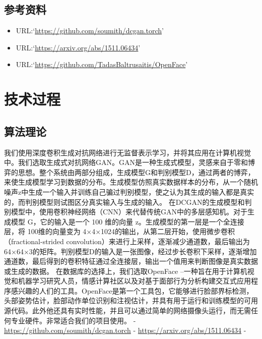 \documentclass[
  hyperref, a4paper]{ctexart}
\providecommand{\tightlist}{%
  \setlength{\itemsep}{0pt}\setlength{\parskip}{0pt}}
\begin{document}
\hypertarget{ux53c2ux8003ux8d44ux6599}{%
\subsection{参考资料}\label{ux53c2ux8003ux8d44ux6599}}

\begin{itemize}
\tightlist
\item
  URL:`\url{https://github.com/soumith/dcgan.torch}'
\item
  URL:`\url{https://arxiv.org/abs/1511.06434}'
\item
  URL:`\url{https://github.com/TadasBaltrusaitis/OpenFace}'
\end{itemize}

\hypertarget{ux6280ux672fux8fc7ux7a0b}{%
\section{技术过程}\label{ux6280ux672fux8fc7ux7a0b}}

\hypertarget{ux7b97ux6cd5ux7406ux8bba}{%
\subsection{算法理论}\label{ux7b97ux6cd5ux7406ux8bba}}

我们使用深度卷积生成对抗网络进行无监督表示学习，并将其应用在计算机视觉中。我们选取生成式对抗网络GAN。GAN是一种生成式模型，灵感来自于零和博弈的思想。整个系统由两部分组成，生成模型G和判别模型D，通过两者的博弈，来使生成模型学习到数据的分布。生成模型仿照真实数据样本的分布，从一个随机噪声z中生成一个输入并训练自己骗过判别模型，使之认为其生成的输入都是真实的，而判别模型则试图区分真实输入与生成的输入。
在DCGAN的生成模型和判别模型中，使用卷积神经网络（CNN）来代替传统GAN中的多层感知机。对于生成模型
G，它的输入是一个 100 维的向量 z。生成模型的第一层是一个全连接层，将
100维的向量变为
4×4×1024的输出，从第二层开始，使用微步卷积（fractional-strided
convolution）来进行上采样，逐渐减少通道数，最后输出为64×64×3的矩阵。判别模型D的输入是一张图像，经过步长卷积下采样，逐渐增加通道数，最后得到的卷积特征通过全连接层，输出一个值用来判断图像是真实数据或生成的数据。
在数据库的选择上，我们选取OpenFace
--一种旨在用于计算机视觉和机器学习研究人员，情感计算社区以及对基于面部行为分析构建交互式应用程序感兴趣的人们的工具。OpenFace是第一个工具包，它能够进行脸部界标检测，头部姿势估计，脸部动作单位识别和注视估计，并具有用于运行和训练模型的可用源代码。此外他还具有实时性能，并且可以通过简单的网络摄像头运行，而无需任何专业硬件。非常适合我们的项目使用。
\newline - \url{https://github.com/soumith/dcgan.torch} -
\url{https://arxiv.org/abs/1511.06434} -
\end{document}
